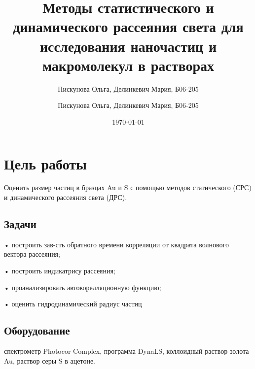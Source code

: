 \documentclass[a4paper,10pt]{article}
\author{Пискунова Ольга, Делинкевич Мария, Б06-205}
\title{Методы статистического и динамического рассеяния света для исследования наночастиц и макромолекул в растворах}
\author{Пискунова Ольга, Делинкевич Мария, Б06-205}
\date{\today}
\begin{document}
\maketitle
\thispagestyle{empty}

\setcounter{page}{2}


\section{Цель работы}
Оценить размер частиц в бразцах Au и S с помощью методов статического (СРС) и динамического рассеяния света (ДРС).
\subsection{Задачи}
• построить зав-сть обратного времени корреляции от квадрата волнового вектора рассеяния;

• построить индикатрису рассеяния;

• проанализировать автокорелляционную функцию;

• оценить гидродинамический радиус частиц
\subsection{Оборудование}
спектрометр Photocor Complex, программа DynaLS, коллоидный раствор золота Au, раствор серы S в ацетоне.
\end{document}
